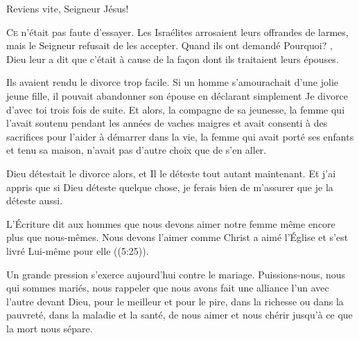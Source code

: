 Reviens vite, Seigneur Jésus! 

\dvrule








\lettrine{C}{e} n'était pas faute d'essayer. Les Israélites arrosaient
 leurs offrandes de larmes, mais le Seigneur refusait de les accepter.
 Quand ils ont demandé \Og Pourquoi? \Fg{}, Dieu leur a dit que c'était
 à cause de la fa\c{c}on dont ils traitaient leurs épouses. 

Ils avaient rendu le divorce trop facile. Si un homme s'amourachait
 d'une jolie jeune fille, il pouvait abandonner son épouse en déclarant
 simplement\frcolon{}  \Og Je divorce d'avec toi \Fg{}
 trois fois de suite. Et alors, la compagne de sa jeunesse,
 la femme qui l'avait soutenu pendant les années de vaches maigres
 et avait consenti à des sacrifices pour l'aider à démarrer dans la vie,
 la femme qui avait porté ses enfants et tenu sa maison,
 n'avait pas d'autre choix que de s'en aller. 


Dieu détestait le divorce alors, et Il le déteste tout autant maintenant.
 Et j'ai appris que si Dieu déteste quelque chose,
 je ferais bien de m'assurer que je la déteste aussi. 

L'Écriture dit aux hommes que nous devons aimer notre femme même encore plus
 que nous-mêmes. Nous devons l'aimer comme \Og Christ a aimé l'Église
 et s'est livré Lui-même pour elle \Fg{} ((5:25)). 

Un grande pression s'exerce aujourd'hui contre le mariage.
 Puissions-nous, nous qui sommes mariés, nous rappeler que nous avons fait
 une alliance l'un avec l'autre devant Dieu, \Og pour le meilleur
 et pour le pire, dans la richesse ou dans la pauvreté, dans la maladie
 et la santé, de nous aimer et nous chérir
 jusqu'à ce que la mort nous sépare. \Fg{}

